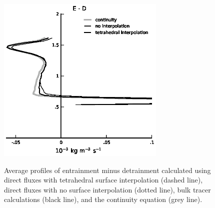 \documentclass[12pt]{article}
\begin{document}
\begin{figure}[t]
  \noindent\includegraphics[width=19pc,angle=0]{./figures/E_minus_D_core.eps}\\
  \caption{Average profiles of entrainment minus detrainment calculated using 
direct fluxes with tetrahedral surface interpolation (dashed line), direct 
fluxes with no surface interpolation (dotted line), bulk tracer calculations 
(black line), and the continuity equation (grey line).}\label{fig:E_minus_D}
\end{figure}
\end{document}

